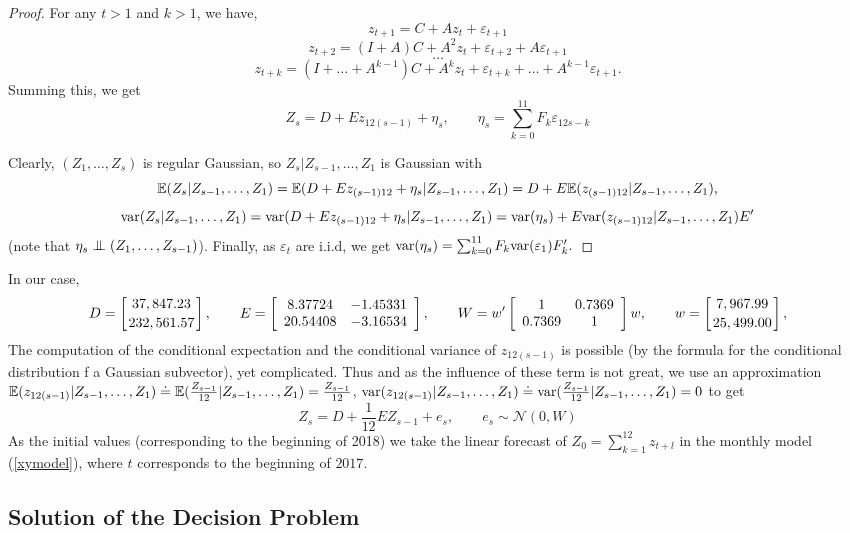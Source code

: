 \documentclass[3p,times]{elsarticle}
\begin{document}
\begin{proof} For any $t>1$ and $k>1$, we have,
$$z_{t+1}=C + A z_{t} + \varepsilon_{t+1}$$
$$z_{t+2}=(I+A)C + A^2 z_{t} + \varepsilon_{t+2}+ A \varepsilon_{t+1}$$
$$\dots$$
$$
z_{t+k} = (I+\dots+A^{k-1}) C + A^k z_t + \varepsilon_{t+k} + \dots + A^{k-1} \varepsilon_{t+1}.
$$
Summing this, we get 
$$
Z_s = D + E z_{12(s-1)}+\eta_s, 
\qquad
\eta_s = \sum_{k=0}^{11} F_k \varepsilon_{12s-k} 
$$


Clearly, $(Z_1,\dots,Z_s)$ is regular Gaussian, so $Z_s|Z_{s-1},\dots,Z_1$ is  Gaussian with
$$
\mathbb{E}(Z_{s}|Z_{s-1},\dots,Z_1)=
\mathbb{E}(D+Ez_{(s-1)12}+\eta_s|Z_{s-1},\dots,Z_1)
=D + E\mathbb{E}(z_{(s-1)12}|Z_{s-1},\dots,Z_1),
$$
$$
\mathrm{var}(Z_{s}|Z_{s-1},\dots,Z_1)=
\mathrm{var}(D+Ez_{(s-1)12}+\eta_s|Z_{s-1},\dots,Z_1)
=\mathrm{var}(\eta_s)+E\mathrm{var}(z_{(s-1)12}|Z_{s-1},\dots,Z_1) E'
$$
(note that $\eta_s\indep (Z_1,\dots,Z_{s-1})$). Finally, as $\varepsilon_t$ are i.i.d, we get 
$
\mathrm{var}(\eta_s) = \sum_{k=0}^{11} F_k \mathrm{var}(\varepsilon_1) F_k'.
$
\end{proof}
In our case, 
$$
D=\left[37,847.23
\atop
232,561.57
\right],
\qquad
E = 
\left[
\begin{array}{cc}
8.37724 & -1.45331 \\
20.54408 & -3.16534
\end{array}
\right],
\qquad 
W = w' 
\left[
\begin{array}{cc}
1 & 0.7369 \\
0.7369 & 1
\end{array}
\right]w,
\qquad 
w =
\left[7,967.99
\atop
25,499.00
\right],
$$
The computation of  the conditional expectation and the conditional variance of $z_{12(s-1)}$ is possible (by the formula for the conditional distribution f a Gaussian subvector), yet complicated. Thus and as the influence of these term is not great, we use an approximation $\mathbb{E}(z_{12(s-1)}|Z_{s-1},\dots,Z_1) \doteq \mathbb{E}(\frac{Z_{s-1}}{12}|Z_{s-1},\dots,Z_1) =\frac{Z_{s-1}}{12}$, $\mathrm{var}(z_{12(s-1)}|Z_{s-1},\dots,Z_1)\doteq \mathrm{var}(\frac{Z_{s-1}}{12}|Z_{s-1},\dots,Z_1)=0$ to get 
$$
Z_s =D+\frac{1}{12} E Z_{s-1} + e_s,\qquad e_s \sim \mathcal{N} (0,W)
$$
As the initial values (corresponding to the beginning of 2018) we take the linear forecast of $Z_0 = \sum_{k=1}^{12} z_{t+l}$ in the monthly model (\ref{xymodel}),  where $t$ corresponds to the beginning of $2017$.


\subsection{Solution of the Decision Problem}
\end{document}
